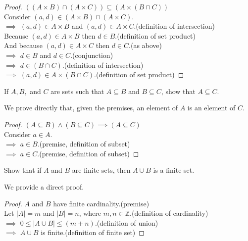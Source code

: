 \documentclass[a4paper]{exam}
\theoremstyle{definition}
\newcommand\Z{\ensuremath{\mathbb{Z}}}
\newcommand\union{\cup}
\newcommand\interx{\cap}
\begin{document}
\begin{questions}
\begin{parts}
\begin{solution}
      \begin{proof}$ ((A \times B) \interx (A \times C)) \subseteq (A \times (B \interx C))$\\
        Consider $(a,d)\in (A \times B) \interx (A \times C)$.\\
        $\implies$ $(a,d)\in A\times B$ and $(a,d)\in A\times C$.\hfill(definition of intersection)\\
        Because $(a,d)\in A\times B$ then $d\in B$.\hfill(definition of set product)\\
        And because $(a,d)\in A\times C$ then $d\in C$.\hfill(as above)\\
        $\implies$ $d\in B$ and $d\in C$.\hfill(conjunction)\\
        $\implies$ $d\in (B\interx C)$.\hfill(definition of intersection)\\
        $\implies$ $(a,d)\in A\times (B\interx C)$.\hfill(definition of set product)
      \end{proof}
    \end{solution}
  \end{parts}
  
\question If $A, B,$ and $C$ are sets such that $A \subseteq B$ and $B \subseteq C$, show that $A \subseteq C$.

  \begin{solution}
    We prove directly that, given the premises, an element of $A$ is an element of $C$.

    \begin{proof}$(A \subseteq B) \land (B \subseteq C)\implies (A \subseteq C)$\\
      Consider $a\in A$.\\
      $\implies$ $a\in B$.\hfill(premise, definition of subset)\\
      $\implies$ $a\in C$.\hfill(premise, definition of subset)
    \end{proof}
  \end{solution}

\question Show that if $A$ and $B$ are finite sets, then  \( A \union B \) is a finite set.

  \begin{solution}
    We provide a direct proof.

    \begin{proof}
      $A$ and $B$ have finite cardinality.\hfill(premise)\\
      Let $|A|=m$ and $|B|=n$, where $m,n\in\Z$.\hfill(definition of cardinality)\\
      $\implies$ $0\le |A\union B|\le (m+n)$.\hfill(definition of union)\\
      $\implies$ $A\union B$ is finite.\hfill(definition of finite set)
    \end{proof}
  \end{solution}
  

\end{questions}
\end{document}
